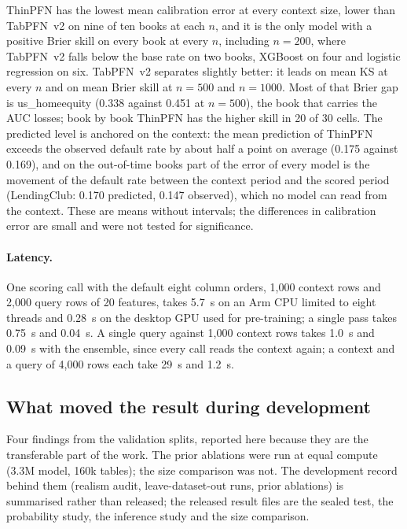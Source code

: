 \documentclass[twocolumn,10pt]{article}
\begin{document}
ThinPFN has the lowest mean calibration error at every context size, lower than TabPFN~v2 on nine of ten books at each
$n$, and it is the only model with a positive Brier skill on every book at every $n$, including $n=200$, where
TabPFN~v2 falls below the base rate on two books, XGBoost on four and logistic regression on six. TabPFN~v2 separates
slightly better: it leads on mean KS at every $n$ and on mean Brier skill at $n=500$ and $n=1000$. Most of that Brier
gap is us\_homeequity (0.338 against 0.451 at $n=500$), the book that carries the AUC losses; book by book ThinPFN has
the higher skill in 20 of 30 cells. The predicted level is anchored on the context: the mean prediction of ThinPFN
exceeds the observed default rate by about half a point on average (0.175 against 0.169), and on the out-of-time books
part of the error of every model is the movement of the default rate between the context period and the scored period
(LendingClub: 0.170 predicted, 0.147 observed), which no model can read from the context. These are means without
intervals; the differences in calibration error are small and were not tested for significance.

\paragraph{Latency.} One scoring call with the default eight column orders, 1,000 context rows and 2,000 query rows of
20 features, takes 5.7~s on an Arm CPU limited to eight threads and 0.28~s on the desktop GPU used for pre-training; a
single pass takes 0.75~s and 0.04~s. A single query against 1,000 context rows takes 1.0~s and 0.09~s with the
ensemble, since every call reads the context again; a context and a query of 4,000 rows each take 29~s and 1.2~s.

\subsection{What moved the result during development}

Four findings from the validation splits, reported here because they are the transferable part of the work. The
prior ablations were run at equal compute (3.3M model, 160k tables); the size comparison was not. The development
record behind them (realism audit, leave-dataset-out runs, prior ablations) is summarised rather than released; the
released result files are the sealed test, the probability study, the inference study and the size comparison.
\end{document}
